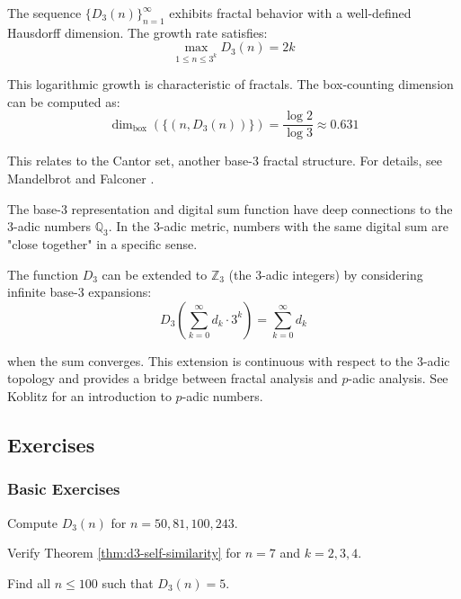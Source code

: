 \begin{advanced}
The sequence $\{D_3(n)\}_{n=1}^{\infty}$ exhibits fractal behavior with a well-defined Hausdorff dimension. The growth rate satisfies:
$$\max_{1 \leq n \leq 3^k} D_3(n) = 2k$$

This logarithmic growth is characteristic of fractals. The box-counting dimension can be computed as:
$$\dim_{\text{box}}(\{(n, D_3(n))\}) = \frac{\log 2}{\log 3} \approx 0.631$$

This relates to the Cantor set, another base-3 fractal structure. For details, see Mandelbrot \cite{mandelbrot1982} and Falconer \cite{falconer2004}.
\end{advanced}

\begin{advanced}
The base-3 representation and digital sum function have deep connections to the 3-adic numbers $\mathbb{Q}_3$. In the 3-adic metric, numbers with the same digital sum are "close together" in a specific sense.

The function $D_3$ can be extended to $\mathbb{Z}_3$ (the 3-adic integers) by considering infinite base-3 expansions:
$$D_3\left(\sum_{k=0}^{\infty} d_k \cdot 3^k\right) = \sum_{k=0}^{\infty} d_k$$

when the sum converges. This extension is continuous with respect to the 3-adic topology and provides a bridge between fractal analysis and $p$-adic analysis. See Koblitz \cite{koblitz1984} for an introduction to $p$-adic numbers.
\end{advanced}

\subsection{Exercises}
\label{subsec:exercises-1-2}

\subsubsection*{Basic Exercises}

\begin{exercise}[1.2.1]
Compute $D_3(n)$ for $n = 50, 81, 100, 243$.
\end{exercise}

\begin{exercise}[1.2.2]
Verify Theorem \ref{thm:d3-self-similarity} for $n = 7$ and $k = 2, 3, 4$.
\end{exercise}

\begin{exercise}[1.2.3]
Find all $n \leq 100$ such that $D_3(n) = 5$.
\end{exercise}


